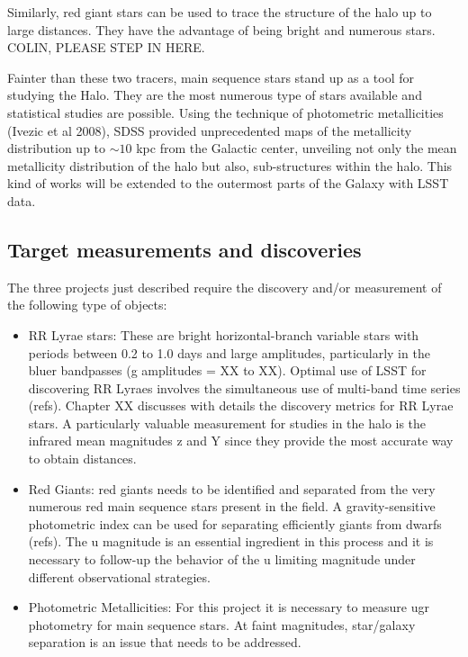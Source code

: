 Similarly, red giant stars can be used to trace the structure of the halo up to large
distances. They have the advantage 
of being bright and numerous stars. COLIN, PLEASE STEP IN HERE.

Fainter than these two tracers, main sequence stars stand up as a tool for studying
the Halo. They are the most numerous type of stars available and statistical studies 
are possible. Using the technique of photometric metallicities (Ivezic et al 2008), 
SDSS provided unprecedented maps of the metallicity distribution up to  $\sim 10$ 
kpc from the Galactic center, unveiling not only the mean metallicity distribution 
of the halo but also, sub-structures within the halo. This kind of works will be extended
to the outermost parts of the Galaxy with LSST data.



\subsection{Target measurements and discoveries}
\label{sec:keyword:MW_Halo_targets}

The three projects just described require the discovery and/or measurement of the following 
type of objects:

\begin{itemize}

\item RR Lyrae stars: These are bright horizontal-branch variable stars with
periods between 0.2 to 1.0 days and large amplitudes, particularly in the bluer 
bandpasses (g amplitudes = XX to XX). Optimal use of LSST for discovering
RR Lyraes involves the simultaneous use of multi-band time series (refs).
Chapter XX discusses with details the discovery metrics for RR Lyrae stars.
A particularly valuable measurement for studies in the halo is the infrared mean
magnitudes z and Y since they provide the most accurate way to obtain 
distances.

\item Red Giants: red giants needs to be identified and separated from the 
very numerous red main sequence stars present in the field. A gravity-sensitive
photometric index can be used for separating efficiently giants from dwarfs (refs).
The u magnitude is an essential ingredient in this process and it is necessary to
follow-up the behavior of the u limiting magnitude under different observational strategies.

\item Photometric Metallicities: For this project it is necessary to measure ugr photometry 
for main sequence stars. At faint magnitudes, star/galaxy separation is an issue that needs
to be addressed.

\end{itemize}

